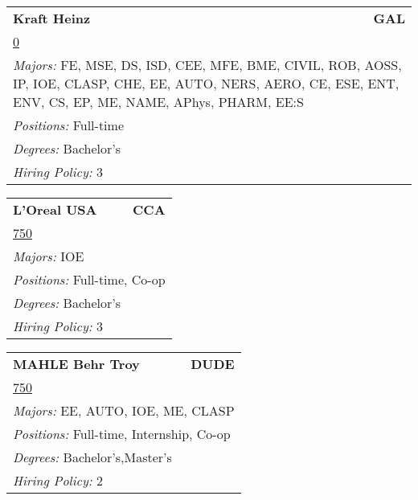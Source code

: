 \documentclass[twoside]{article}
\begin{document}
\begin{center}
\begin{multicols}{3}
\begin{FlushLeft}
\begin{minipage}{\columnwidth}
\end{minipage}
 
\begin{minipage}{\columnwidth}\begin{tabularx}{.95\columnwidth}{Xr}
                 {\Large\bf Kraft Heinz} & {\Large\bf GAL}\\
    \multicolumn{2}{p{.95\columnwidth}}{\url{0}}\\
    \multicolumn{2}{p{.95\columnwidth}}{\emph{Majors:} FE, MSE, DS, ISD, CEE, MFE, BME, CIVIL, ROB, AOSS, IP, IOE, CLASP, CHE, EE, AUTO, NERS, AERO, CE, ESE, ENT, ENV, CS, EP, ME, NAME, APhys, PHARM, EE:S}\\
    \multicolumn{2}{p{.95\columnwidth}}{\emph{Positions:} Full-time}\\
    \multicolumn{2}{p{.95\columnwidth}}{\emph{Degrees:} Bachelor's}\\
    \multicolumn{2}{p{.95\columnwidth}}{\emph{Hiring Policy:} 3}\\
    \end{tabularx}
    
\end{minipage}
 
\begin{minipage}{\columnwidth}\begin{tabularx}{.95\columnwidth}{Xr}
                 {\Large\bf L'Oreal USA} & {\Large\bf CCA}\\
    \multicolumn{2}{p{.95\columnwidth}}{\url{750}}\\
    \multicolumn{2}{p{.95\columnwidth}}{\emph{Majors:} IOE}\\
    \multicolumn{2}{p{.95\columnwidth}}{\emph{Positions:} Full-time, Co-op}\\
    \multicolumn{2}{p{.95\columnwidth}}{\emph{Degrees:} Bachelor's}\\
    \multicolumn{2}{p{.95\columnwidth}}{\emph{Hiring Policy:} 3}\\
    \end{tabularx}
    
\end{minipage}
 
\begin{minipage}{\columnwidth}\begin{tabularx}{.95\columnwidth}{Xr}
                 {\Large\bf MAHLE Behr Troy} & {\Large\bf DUDE}\\
    \multicolumn{2}{p{.95\columnwidth}}{\url{750}}\\
    \multicolumn{2}{p{.95\columnwidth}}{\emph{Majors:} EE, AUTO, IOE, ME, CLASP}\\
    \multicolumn{2}{p{.95\columnwidth}}{\emph{Positions:} Full-time, Internship, Co-op}\\
    \multicolumn{2}{p{.95\columnwidth}}{\emph{Degrees:} Bachelor's,Master's}\\
    \multicolumn{2}{p{.95\columnwidth}}{\emph{Hiring Policy:} 2}\\
    \end{tabularx}
    

\end{minipage}
\end{FlushLeft}
\end{multicols}
\end{center}
\end{document}
